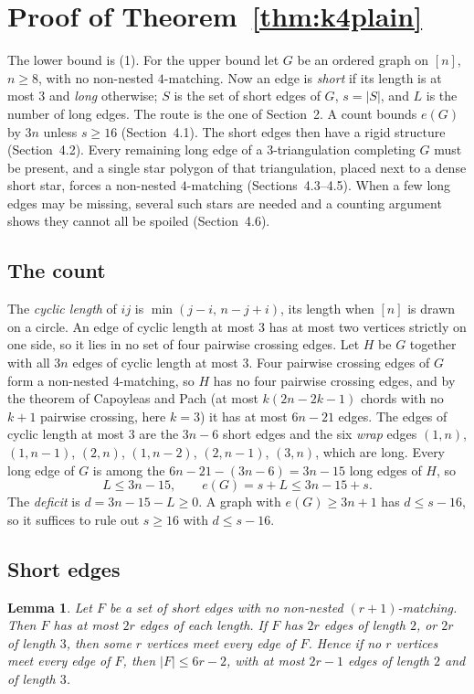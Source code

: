 \documentclass[11pt]{amsart}
\newtheorem{lemma}[theorem]{Lemma}
\theoremstyle{definition}\newtheorem{problem}{Problem}
\theoremstyle{remark}\newtheorem*{remark}{Remark}
\begin{document}
\section{Proof of Theorem~\ref{thm:k4plain}}\label{sec:k4plain}
The lower bound is (1). For the upper bound let $G$ be an ordered graph on $[n]$, $n\ge8$, with no non-nested
$4$-matching. Now an edge is \emph{short} if its length is at most $3$ and \emph{long} otherwise; $S$ is the set of
short edges of $G$, $s=|S|$, and $L$ is the number of long edges. The route is the one of Section~2. A count bounds
$e(G)$ by $3n$ unless $s\ge16$ (Section~4.1). The short edges then have a rigid structure (Section~4.2). Every
remaining long edge of a $3$-triangulation completing $G$ must be present, and a single star polygon of that
triangulation, placed next to a dense short star, forces a non-nested $4$-matching (Sections~4.3--4.5). When a few long
edges may be missing, several such stars are needed and a counting argument shows they cannot all be spoiled
(Section~4.6).

\subsection{The count}
The \emph{cyclic length} of $ij$ is $\min(j-i,\,n-j+i)$, its length when $[n]$ is drawn on a circle. An edge of
cyclic length at most $3$ has at most two vertices strictly on one side, so it lies in no set of four pairwise
crossing edges. Let $H$ be $G$ together with all $3n$ edges of cyclic length at most $3$. Four pairwise crossing edges
of $G$ form a non-nested $4$-matching, so $H$ has no four pairwise crossing edges, and by the theorem of Capoyleas
and Pach \cite{CP} (at most $k(2n-2k-1)$ chords with no $k+1$ pairwise crossing, here $k=3$) it has at most $6n-21$
edges. The edges of cyclic length at most $3$ are the $3n-6$ short edges and the six \emph{wrap} edges $(1,n)$,
$(1,n-1)$, $(2,n)$, $(1,n-2)$, $(2,n-1)$, $(3,n)$, which are long. Every long edge of $G$ is among the
$6n-21-(3n-6)=3n-15$ long edges of $H$, so
\[
L\le 3n-15,\qquad e(G)=s+L\le 3n-15+s. \tag{3}
\]
The \emph{deficit} is $d=3n-15-L\ge0$. A graph with $e(G)\ge3n+1$ has $d\le s-16$, so it suffices to rule out
$s\ge16$ with $d\le s-16$.

\subsection{Short edges}
\begin{lemma}\label{lem:len}
Let $F$ be a set of short edges with no non-nested $(r+1)$-matching. Then $F$ has at most $2r$ edges of each length.
If $F$ has $2r$ edges of length $2$, or $2r$ of length $3$, then some $r$ vertices meet every edge of $F$. Hence if no
$r$ vertices meet every edge of $F$, then $|F|\le 6r-2$, with at most $2r-1$ edges of length $2$ and of length $3$.
\end{lemma}
\end{document}
